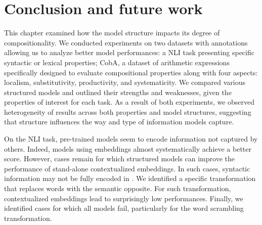 
\section{Conclusion and future work}

This chapter examined how the model structure impacts its degree of compositionality. We conducted experiments on two datasets with annotations allowing us to analyze better model performances: a NLI task presenting specific syntactic or lexical properties; CobA, a dataset of arithmetic expressions specifically designed to evaluate compositional properties along with four aspects: localism, substitutivity, productivity, and systematicity. We compared various structured models and outlined their strengths and weaknesses, given the properties of interest for each task. As a result of both experiments, we observed heterogeneity of results across both properties and model structures, suggesting that structure influences the way and type of information models capture.

On the NLI task, pre-trained \bert models seem to encode information not captured by others. Indeed, models using \bert embeddings almost systematically achieve a better score. However, cases remain for which structured models can improve the performance of stand-alone contextualized embeddings. In such cases, syntactic information may not be fully encoded in \bert. We identified a specific transformation that replaces words with the semantic opposite. For such transformation, \bert contextualized embeddings lead to surprisingly low performances. Finally, we identified cases for which all models fail, particularly for the word scrambling transformation. 

